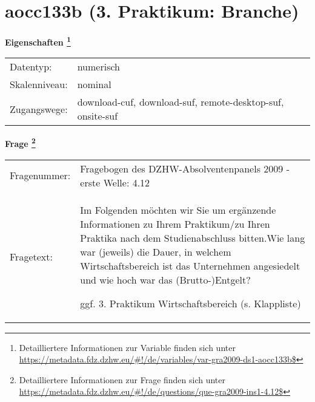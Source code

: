 
    \setcounter{footnote}{0}

    \vspace*{-1.8cm}
	\section{aocc133b (3. Praktikum: Branche)}
	\label{section:aocc133b}



    \vspace*{0.5cm}
    \noindent\textbf{Eigenschaften
	\footnote{Detailliertere Informationen zur Variable finden sich unter
		\url{https://metadata.fdz.dzhw.eu/\#!/de/variables/var-gra2009-ds1-aocc133b$}}}\\
	\begin{tabularx}{\hsize}{@{}lX}
	Datentyp: & numerisch \\
	Skalenniveau: & nominal \\
	Zugangswege: &
	  download-cuf, 
	  download-suf, 
	  remote-desktop-suf, 
	  onsite-suf
 \\
    \end{tabularx}



				\vspace*{0.5cm}
                \noindent\textbf{Frage
	                \footnote{Detailliertere Informationen zur Frage finden sich unter
		              \url{https://metadata.fdz.dzhw.eu/\#!/de/questions/que-gra2009-ins1-4.12$}}}\\
				\begin{tabularx}{\hsize}{@{}lX}
					Fragenummer: &
					  Fragebogen des DZHW-Absolventenpanels 2009 - erste Welle:
					  4.12
 \\
					Fragetext: & Im Folgenden möchten wir Sie um ergänzende Informationen zu Ihrem Praktikum/zu Ihren Praktika nach dem Studienabschluss bitten.Wie lang war (jeweils) die Dauer, in welchem Wirtschaftsbereich ist das Unternehmen angesiedelt und wie hoch war das (Brutto-)Entgelt?\par  ggf. 3. Praktikum Wirtschaftsbereich (s. Klappliste) \\
				\end{tabularx}





